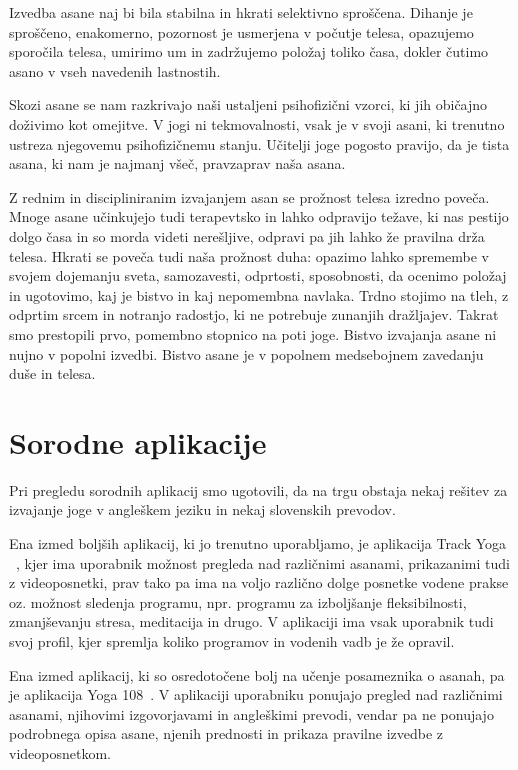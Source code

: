 \documentclass[a4paper, 12pt]{book}
\begin{document}
Izvedba asane naj bi bila stabilna in hkrati selektivno sproščena. Dihanje je sproščeno, enakomerno, pozornost je usmerjena v počutje telesa, opazujemo sporočila telesa, umirimo um in zadržujemo položaj toliko časa, dokler čutimo asano v vseh navedenih lastnostih. 

Skozi asane se nam razkrivajo naši ustaljeni psihofizični vzorci, ki jih običajno doživimo kot omejitve. V jogi ni tekmovalnosti, vsak je v svoji asani, ki trenutno ustreza njegovemu psihofizičnemu stanju. Učitelji joge pogosto pravijo, da je tista asana, ki nam je najmanj všeč, pravzaprav naša asana.

Z rednim in discipliniranim izvajanjem asan se prožnost telesa izredno poveča. Mnoge asane učinkujejo tudi terapevtsko in lahko odpravijo težave, ki nas pestijo dolgo časa in so morda videti nerešljive, odpravi pa jih lahko že pravilna drža telesa. Hkrati se poveča tudi naša prožnost duha: opazimo lahko spremembe v svojem dojemanju sveta, samozavesti, odprtosti, sposobnosti, da ocenimo položaj in ugotovimo, kaj je bistvo in kaj nepomembna navlaka. Trdno stojimo na tleh, z odprtim srcem in notranjo radostjo, ki ne potrebuje zunanjih dražljajev. Takrat smo prestopili prvo, pomembno stopnico na poti joge.
Bistvo izvajanja asane ni nujno v popolni izvedbi. Bistvo asane je v popolnem medsebojnem zavedanju duše in telesa.

\section{Sorodne aplikacije}
Pri pregledu sorodnih aplikacij smo ugotovili, da na trgu obstaja nekaj rešitev za izvajanje joge v angleškem jeziku in nekaj slovenskih prevodov.

Ena izmed boljših aplikacij, ki jo trenutno uporabljamo, je aplikacija Track Yoga ~\cite{trackyoga}, kjer ima uporabnik možnost pregleda nad različnimi asanami, prikazanimi tudi z videoposnetki, prav tako pa ima na voljo različno dolge posnetke vodene prakse oz. možnost sledenja programu, npr. programu za izboljšanje fleksibilnosti, zmanjševanju stresa, meditacija in drugo. V aplikaciji ima vsak uporabnik tudi svoj profil, kjer spremlja koliko programov in vodenih vadb je že opravil.

Ena izmed aplikacij, ki so osredotočene bolj na učenje posameznika o asanah, pa je aplikacija Yoga 108~\cite{yoga108}. V aplikaciji uporabniku ponujajo pregled nad različnimi asanami, njihovimi izgovorjavami in angleškimi prevodi, vendar pa ne ponujajo podrobnega opisa asane, njenih prednosti in prikaza pravilne izvedbe z videoposnetkom.
\end{document}
